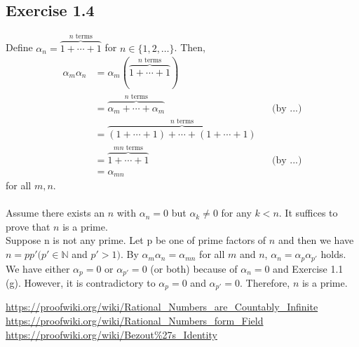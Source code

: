 \documentclass{article}
\begin{document}
\let\rem\undefined
\let\Zm\undefined

\subsection{Exercise 1.4}
\newcommand\F{\mathfrak F}
Define $\alpha_n = \overbrace{1 + \cdots + 1}^\text{$n$ terms}$ for $n \in \{1, 2, \ldots\}$.
Then, \begin{align*}
  \alpha_m\alpha_n
  &= \alpha_m(\overbrace{1 + \dotsb + 1}^\text{$n$ terms}) \\
  &= \overbrace{\alpha_m + \dotsb + \alpha_m}^\text{$n$ terms} && \text{(by ...)} \\
  &= \overbrace{(1 + \dotsb + 1) + \dotsb + (1 + \dotsb + 1)}^\text{$n$ terms} \\
  &= \overbrace{1 + \dotsb + 1}^\text{$mn$ terms} && \text{(by ...)} \\
  &= \alpha_{mn}
\end{align*} for all $m, n$.\\\\
Assume there exists an $n$ with $\alpha_n = 0$ but $\alpha_k \ne 0$ for any $k < n$.
It suffices to prove that $n$ is a prime.\\
Suppose n is not any prime. Let p be one of prime factors of $n$ and then we have $n = p p' (p' \in\mathbb{N}$ and $p' > 1)$.
By $\alpha_m \alpha_n = \alpha_{mn}$ for all $m$ and $n$, $\alpha_n = \alpha_p \alpha_{p'}$ holds.
We have either $\alpha_p = 0$ or $\alpha_{p'} = 0$ (or both) because of $\alpha_n = 0$ and Exercise 1.1 (g).
However, it is contradictory to $\alpha_p = 0$ and $\alpha_{p'} = 0$. Therefore, $n$ is a prime.

\begin{thebibliography}{9}
 \url{https://proofwiki.org/wiki/Rational_Numbers_are_Countably_Infinite}
 \url{https://proofwiki.org/wiki/Rational_Numbers_form_Field}
 \url{https://proofwiki.org/wiki/Bezout\%27s_Identity}
\end{thebibliography}
\end{document}
